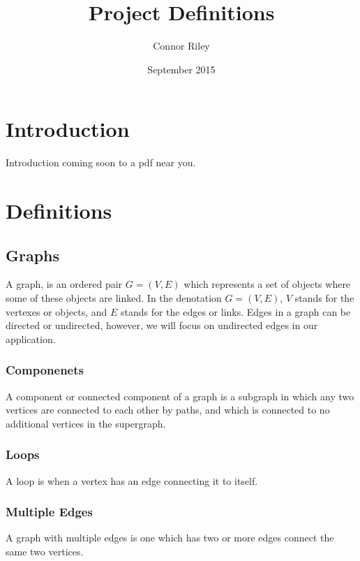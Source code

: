 \documentclass{article}
\title{Project Definitions}
\author{Connor Riley }
\date{September 2015}
\begin{document}
\maketitle

\section{Introduction}
Introduction coming soon to a pdf near you.
\section{Definitions}
\subsection{Graphs}
A graph, is an ordered pair $G=(V,E)$ which represents a set of objects where some of these objects are linked. In the denotation $G=(V,E)$, $V$ stands for the vertexes or objects, and $E$ stands for the edges or links. Edges in a graph can be directed or undirected, however, we will focus on undirected edges in our application.
\subsubsection{Componenets}
A component or connected component of a graph is a subgraph in which any two vertices are connected to each other by paths, and which is connected to no additional vertices in the supergraph.
\subsubsection{Loops}
A loop is when a vertex has an edge connecting it to itself.
\begin{center}
\end{center}
\subsubsection{Multiple Edges}
A graph with multiple edges is one which has two or more edges connect the same two vertices.
\begin{center}
\end{center}
\end{document}
